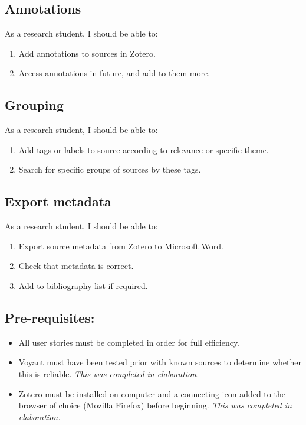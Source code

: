\documentclass{article}
\begin{document}
\subsection{Annotations}
As a research student, I should be able to:
\begin{enumerate}
    \item Add annotations to sources in Zotero.
    \item Access annotations in future, and add to them more.
    \end{enumerate}
\subsection{Grouping}
As a research student, I should be able to:
\begin{enumerate}
    \item Add tags or labels to source according to relevance or specific theme.
    \item Search for specific groups of sources by these tags.
\end{enumerate}
\subsection{Export metadata}
As a research student, I should be able to:
\begin{enumerate}
    \item Export source metadata from Zotero to Microsoft Word.
    \item Check that metadata is correct.
    \item Add to bibliography list if required.
\end{enumerate}

\subsection{Pre-requisites:}
\begin{itemize}
    \item All user stories must be completed in order for full efficiency. 
    \item Voyant must have been tested prior with known sources to determine whether this is reliable. \textit{This was completed in elaboration.}
    \item Zotero must be installed on computer and a connecting icon added to the browser of choice (Mozilla Firefox) before beginning. \textit{This was completed in elaboration.}
    \end{itemize}
\end{document}
